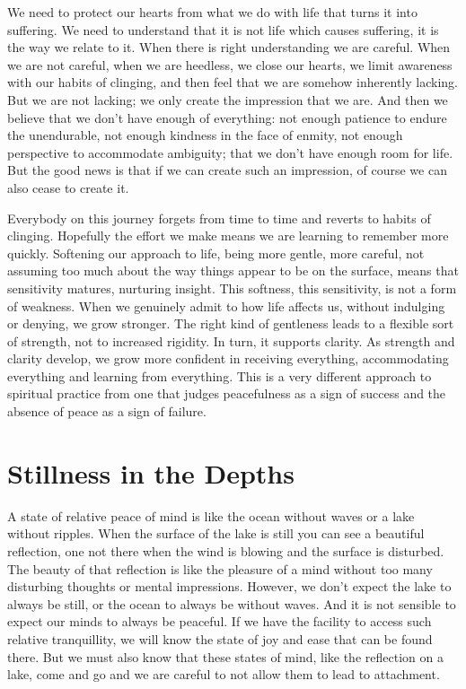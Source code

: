 We need to protect our hearts from what we do with life that turns it
into suffering. We need to understand that it is not life which causes
suffering, it is the way we relate to it. When there is right
understanding we are careful. When we are not careful, when we are
heedless, we close our hearts, we limit awareness with our habits of
clinging, and then feel that we are somehow inherently lacking. But we
are not lacking; we only create the impression that we are. And then we
believe that we don’t have enough of everything: not enough patience to
endure the unendurable, not enough kindness in the face of enmity, not
enough perspective to accommodate ambiguity; that we don’t have enough
room for life. But the good news is that if we can create such an
impression, of course we can also cease to create it.

Everybody on this journey forgets from time to time and reverts to
habits of clinging. Hopefully the effort we make means we are learning
to remember more quickly. Softening our approach to life, being more
gentle, more careful, not assuming too much about the way things appear
to be on the surface, means that sensitivity matures, nurturing insight.
This softness, this sensitivity, is not a form of weakness. When we
genuinely admit to how life affects us, without indulging or denying, we
grow stronger. The right kind of gentleness leads to a flexible sort of
strength, not to increased rigidity. In turn, it supports clarity. As
strength and clarity develop, we grow more confident in receiving
everything, accommodating everything and learning from everything. This
is a very different approach to spiritual practice from one that judges
peacefulness as a sign of success and the absence of peace as a sign of
failure.

\section{Stillness in the Depths}

A state of relative peace of mind is like the ocean without waves or a
lake without ripples. When the surface of the lake is still you can see
a beautiful reflection, one not there when the wind is blowing and the
surface is disturbed. The beauty of that reflection is like the pleasure
of a mind without too many disturbing thoughts or mental impressions.
However, we don’t expect the lake to always be still, or the ocean to
always be without waves. And it is not sensible to expect our minds to
always be peaceful. If we have the facility to access such relative
tranquillity, we will know the state of joy and ease that can be found
there. But we must also know that these states of mind, like the
reflection on a lake, come and go and we are careful to not allow them
to lead to attachment.

